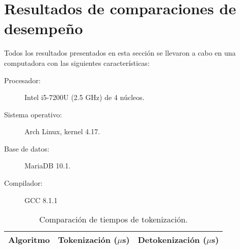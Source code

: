 %
%
%

\section{Resultados de comparaciones de desempeño}

Todos los resultados presentados en esta sección se llevaron a cabo en una
computadora con las siguientes características:

\begin{description}
    \item[Procesador:] Intel i5-7200U (2.5 GHz) de 4 núcleos.
    \item[Sistema operativo:] Arch Linux, kernel 4.17.
    \item[Base de datos:] MariaDB 10.1.
    \item[Compilador:] GCC 8.1.1
\end{description}

\begin{table}
  \begin{center}
    \begin{tabular}{|c|c|c|}
      \hline
      Algoritmo & Tokenización ($\mu$s) & Detokenización ($\mu$s) \\
      \hline
      
    \end{tabular}
    \caption{Comparación de tiempos de tokenización.}
    \label{tabla:tiempos_tokenizacion}
  \end{center}
\end{table}
